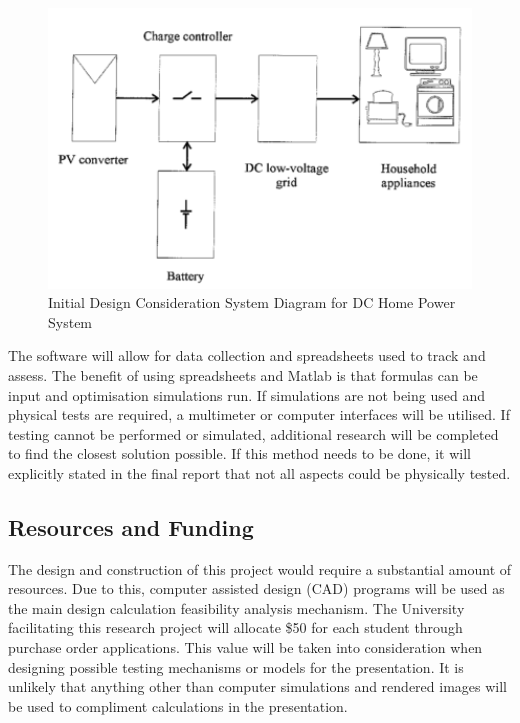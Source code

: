 \begin{figure}[H]
\hfill\includegraphics[width = 120mm]{images/DC_Home}\hspace*{\fill}
\caption{Initial Design Consideration System Diagram for DC Home Power System \cite{Pellis1997}} 
\label{fig:DCHomeSystem}
\end{figure} 

The software will allow for data collection and spreadsheets used to track and assess. The benefit of using spreadsheets and Matlab is that formulas can be input and optimisation simulations run. If simulations are not being used and physical tests are required, a multimeter or computer interfaces will be utilised. If testing cannot be performed or simulated, additional research will be completed to find the closest solution possible. If this method needs to be done, it will explicitly stated in the final report that not all aspects could be physically tested.     

\newpage

\subsection{Resources and Funding}

The design and construction of this project would require a substantial amount of resources. Due to this, computer assisted design (CAD) programs will be used as the main design calculation feasibility analysis mechanism. The University facilitating this research project will allocate \$50 for each student through purchase order applications. This value will be taken into consideration when designing possible testing mechanisms or models for the presentation. It is unlikely that anything other than computer simulations and rendered images will be used to compliment calculations in the presentation.  

